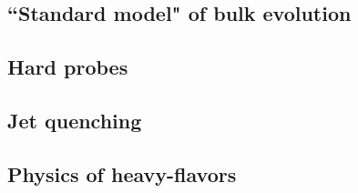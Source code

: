 \subsection{``Standard model" of bulk evolution}


\subsection{Hard probes}

\subsection{Jet quenching}

\subsection{Physics of heavy-flavors}